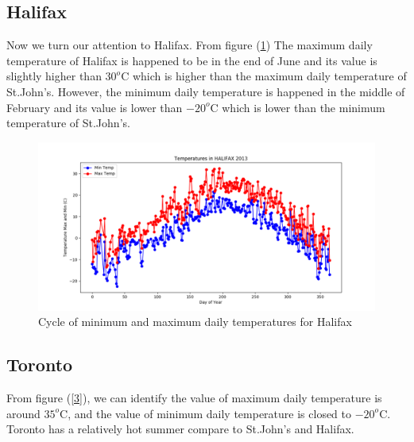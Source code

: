 \documentclass[12pt]{article}
\begin{document}
\subsection{ \bf Halifax }

Now we turn our attention to Halifax. From figure (\ref{2}) The maximum daily temperature of Halifax is happened to be in the end of June and its value is slightly higher than $30^{o}$C which is higher than the maximum daily temperature of St.John's. However, the minimum daily temperature is happened in the middle of February and its value is lower than $-20^{o}$C which is lower than the minimum temperature of St.John's.






\begin{center}
\begin{figure}[H]
\includegraphics[width=5.25in]{../Plot/HALIFAX/day_vs_temp_2013.png}



\caption{Cycle of minimum and maximum daily temperatures for Halifax}
\label{2}
\end{figure}
\end{center}









\subsection{ \bf Toronto }



From figure (\ref{3}), we can identify the value of maximum daily temperature is around $35^{o}$C, and the value of minimum daily temperature is closed to $-20^{o}$C. Toronto has a relatively hot summer compare to St.John's and Halifax. 
\end{document}
